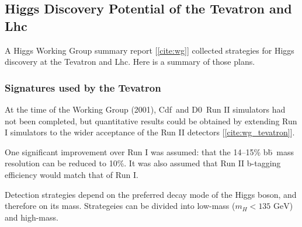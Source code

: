 \documentclass[12pt]{article}
\def\cdf{{\sc Cdf}}
\def\dzero{{\sc D0}}
\def\lhc{{\sc Lhc}}
\def\bbbar{b\={b}}
\begin{document}
\subsection{Higgs Discovery Potential of the Tevatron and \lhc}

A Higgs Working Group summary report [\ref{cite:wg}] collected
strategies for Higgs discovery at the Tevatron and \lhc. Here is a
summary of those plans.

\subsubsection{Signatures used by the Tevatron}

At the time of the Working Group (2001), \cdf\ and \dzero\ {\sc Run II}
simulators had not been completed, but quantitative results could be
obtained by extending {\sc Run I} simulators to the wider acceptance
of the {\sc Run II} detectors [\ref{cite:wg_tevatron}].

One significant improvement over {\sc Run I} was assumed: that the
14--15\% \bbbar\ mass resolution can be reduced to 10\%. It was also
assumed that {\sc Run II} b-tagging efficiency would match that of
{\sc Run I}.

Detection strategies depend on the preferred decay mode of the Higgs
boson, and therefore on its mass. Strategeies can be divided into
low-mass ($m_H < \mbox{135 GeV}$) and high-mass.

\vspace{\parskip}
\end{document}
